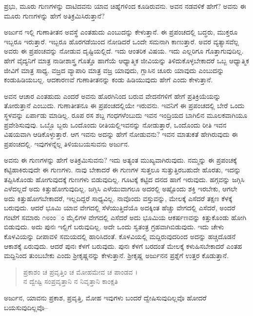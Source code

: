 {\small ಪ್ರಭು, ಮೂರು ಗುಣಗಳನ್ನು ದಾಟಿದವನು ಯಾವ ಚಿಹ್ನೆಗಳಿಂದ ಕೂಡಿರುವನು. ಅವನ ನಡವಳಿಕೆ ಹೇಗೆ? ಅವನು ಈ ಮೂರು ಗುಣಗಳನ್ನು ಹೇಗೆ ಅತಿಕ್ರಮಿಸಿರುತ್ತಾನೆ?}

ಅರ್ಜುನ ಇಲ್ಲಿ ಗುಣಾತೀತನ ಅವಸ್ಥೆ ಎಂತಹುದು ಎಂಬುದನ್ನು ಕೇಳುತ್ತಾನೆ. ಈ ಪ್ರಪಂಚದಲ್ಲಿ ಬದ್ಧರು, ಮುಕ್ತರೂ ಇಬ್ಬರೂ ಇರುತ್ತಾರೆ. ಇಬ್ಬರೂ ಹೊರಗಡೆಯಿಂದ ನೋಡಿದರೆ ಒಂದೇ ಸಮನಾಗಿ ಕಾಣುತ್ತಾರೆ. ಅವರ ವ್ಯತ್ಯಾಸವೆಲ್ಲ ಅವರು ಈ ಪ್ರಪಂಚವನ್ನು ನೋಡುವ ದೃಷ್ಟಿಯಲ್ಲಿದೆ. ಇದು ಆಂತರಿಕ ವಿಷಯ. ಇದು ಎಲ್ಲರಿಗೂ ಗೊತ್ತಾಗುವುದಿಲ್ಲ. ಹೇಗೆ ವೈದ್ಯನಿಗೆ ಮಾತ್ರ ನಾಡೀಶಾಸ್ತ್ರ ಗೊತ್ತೊ ಹಾಗೆಯೆ ಆಧ್ಯಾತ್ಮಿಕ ಜೀವಿಯನ್ನು ತಿಳಿದುಕೊಳ್ಳಬೇಕಾದರೆ ಒಬ್ಬ ಆಧ್ಯಾತ್ಮಿಕ ಜೀವಿಗೆ ಮಾತ್ರ ಸಾಧ್ಯ. ವಜ್ರದ ವ್ಯಾಪಾರಿ ಮಾತ್ರ ವಜ್ರ ಯಾವುದು, ಗ್ಲಾಸಿನ ಚೂರು ಯಾವುದು ಎಂಬುದನ್ನು ಕಂಡುಹಿಡಿಯಬಲ್ಲ. ಆದಕಾರಣವೆ ಗುಣಾತೀತನನ್ನು ಕಂಡು ಹಿಡಿಯುವುದು ಹೇಗೆ ಎಂದು ಕೇಳುತ್ತಾನೆ.

ಅವನ ಆಚಾರ ಎಂತಹುದು ಎಂದರೆ ಅವನು ಹೊರಗಿನಿಂದ ಬರುವ ವೇದನೆಗಳಿಗೆ ಹೇಗೆ ಪ್ರತಿಕ್ರಿಯೆಯನ್ನು ತೋರುತ್ತಾನೆ ಎಂಬುದು. ಗುಣಾತೀತನೂ ಈ ಪ್ರಪಂಚದಲ್ಲಿಯೇ ಇರುವನು. ಇವನಿಗೆ ಈ ಪ್ರಪಂಚದಲ್ಲಿ ಬೇರೆ ಒಂದು ಸ್ಥಳವನ್ನು ಏರ್ಪಾಡು ಮಾಡಿಲ್ಲ. ರೂಪ ರಸ ಶಬ್ದ ಗಂಧಗಳೆಂಬುದು ಇವನ ಇಂದ್ರಿಯದ ಬಾಗಿಲಿನ ಮೂಲಕವಾಗಿಯೂ ಪ್ರವೇಶಿಸುವುವು. ಒಬ್ಬೊ ಬ್ಬರು ಒಂದೊಂದು ರೀತಿಯಲ್ಲಿಇವನನ್ನು ನೋಡುತ್ತಾರೆ, ಒಂದೊಂದು ರೀತಿ ಇವನ ವಿಷಯವಾಗಿ ಆಡಿಕೊಳ್ಳುತ್ತಾರೆ. ಆಗ ಇವನು ಅದನ್ನು ಹೇಗೆ ನೋಡುವನು? ಇವನ ಮಾತುಕತೆ ಹೇಗಿರುವುದು ಈ ಪ್ರಪಂಚದಲ್ಲಿ. ಇವುಗಳನ್ನೆಲ್ಲ ತಿಳಿಯಬಯಸುವನು ಅರ್ಜುನ.

ಅವನು ಈ ಗುಣಗಳನ್ನು ಹೇಗೆ ಅತಿಕ್ರಮಿಸುವನು? ಇದು ಅತ್ಯಂತ ಮುಖ್ಯವಾಗಿರುವುದು. ನಮ್ಮನ್ನು ಈ ಪ್ರಪಂಚಕ್ಕೆ ಕಟ್ಟಿಹಾಕಿರುವುದೇ ಈ ಗುಣಗಳು. ನಾವು ಬೇಕಾದರೆ ಈ ಗುಣಗಳ ಸುತ್ತಲೂ ಸುತ್ತುತ್ತಿರಬಹುದೇ ಹೊರತು, ಇದನ್ನು ತಪ್ಪಿಸಿಕೊಂಡು ಹೋಗುವುದಕ್ಕೆ ಗುಣಗಳು ಬಿಡುವುದಿಲ್ಲ. ಗೂಟಕ್ಕೆ ಕಟ್ಟಿದ ದನದ ಹಾಗೆ ಇರುವುದು. ಹಗ್ಗವನ್ನು ಜಗ್ಗಿಸಿ ಎಳೆದಲ್ಲದೆ ಅದು ಕಿತ್ತುಹೋಗುವುದಿಲ್ಲ. ಜಗ್ಗಿಸಿ ಎಳೆಯುವಾಗಲೂ ಅದರಲ್ಲಿ ಅಷ್ಟೊಂದು ಶಕ್ತಿ ಇರಬೇಕು, ಆಗಲೇ ಅದು ಕಿತ್ತುಹೋಗಬೇಕಾದರೆ, ಇಲ್ಲದಿದ್ದರೆ ಸಾಧ್ಯವಿಲ್ಲ. ನಾವೊಂದು ವಸ್ತುವನ್ನು, ಮೇಲಕ್ಕೆ ಎಸೆದರೆ ತಕ್ಷಣ ಕೆಳಕ್ಕೆ ಬರುವುದು. ಆದರೆ ಭೂಮಿ ಯಾವ ವೇಗದಲ್ಲಿ ಸೆಳೆಯುತ್ತಿದೆಯೊ ಅದಕ್ಕಿಂತ ಹೆಚ್ಚು ವೇಗದಲ್ಲಿ ಎಸೆದರೆ, ಅಂದರೆ ಗಂಟೆಗೆ ಸಮಾರು ೧೮ಂಂಂ ಮೈಲಿಗಳ ವೇಗದಲ್ಲಿ ಎಸೆದರೆ ಅದು ಭೂಮಿಯ ಆಕರ್ಷಣವನ್ನು ಕಿತ್ತುಕೊಂಡು ಹೋಗಿ ಬಿಡುವುದು. ಅದು ಪುನಃ ಇಲ್ಲಿಗೆ ಬರುವುದಿಲ್ಲ. ಅದೇ ಒಂದು ಸ್ವತಂತ್ರ ಗ್ರಹವಾಗಿಬಿಡುವುದು. ಇದು ಚೇಳು ಕೊಳವಿಯನ್ನು ದೀಪಾವಳಿ ಸಮಯದಲ್ಲಿ ಹಾರಿಸಿದಂತೆ. ಕೊಳವಿಯಲ್ಲಿ ಮದ್ದಿರುವುದರಿಂದ ಅದನ್ನು ಹಚ್ಚಿದೊಡನೆ ಆಕಾಶಕ್ಕೆ ಏರುವುದು. ಆದರೆ ಪುನಃ ಕೆಳಗೆ ಬರುವುದು. ಪುನಃ ಕೆಳಗೆ ಬರದಂತೆ ಮೇಲಕ್ಕೆ ಕಳುಹಿಸಬೇಕಾದರೆ ಎಂತಹ ಮದ್ದಿನಿಂದ ತುಂಬಬೇಕು ಎಂದು ಶ್ರೀಕೃಷ್ಣನನ್ನು ಕೇಳುತ್ತಾನೆ. ಶ್ರೀಕೃಷ್ಣ ಅರ್ಜುನನ ಪ್ರಶ್ನೆಗೆ ಉತ್ತರ ಕೊಡುತ್ತಾನೆ.

\begin{verse}
ಪ್ರಕಾಶಂ ಚ ಪ್ರವೃತ್ತಿಂ ಚ ಮೋಹಮೇವ ಚ ಪಾಂಡವ ।\\ನ ದ್ವೇಷ್ಟಿ ಸಂಪ್ರವೃತ್ತಾನಿ ನ ನಿವೃತ್ತಾನಿ ಕಾಂಕ್ಷತಿ 
\end{verse}

{\small ಅರ್ಜುನ, ಯಾವನು ಪ್ರಕಾಶ, ಪ್ರವೃತ್ತಿ, ಮೋಹ ಇವುಗಳು ಬಂದರೆ ದ್ವೇಷಿಸುವುದಿಲ್ಲವೊ ಹೋದರೆ ಬಯಸುವುದಿಲ್ಲವೊ--}

